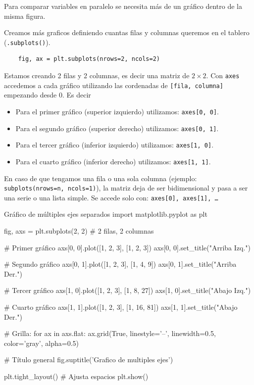 Para comparar variables en paralelo se necesita más de un gráfico dentro de la misma figura. 

Creamos más graficos definiendo cuantas filas y columnas queremos en el tablero (\texttt{.subplots()}).
\begin{verbatim}
    fig, ax = plt.subplots(nrows=2, ncols=2)
\end{verbatim}
Estamos creando 2 filas y 2 columnas, es decir una matriz de \(2 \times 2\).
Con \texttt{axes} accedemos a cada gráfico utilizando las cordenadas de \texttt{[fila, columna]} empezando desde 0. Es decir \begin{itemize}
    \item Para el primer gráfico (superior izquierdo) utilizamos: \texttt{axes[0, 0]}.
    \item Para el segundo gráfico (superior derecho) utilizamos: \texttt{axes[0, 1]}.
    \item Para el tercer gráfico (inferior izquierdo) utilizamos: \texttt{axes[1, 0]}.
    \item Para el cuarto gráfico (inferior derecho) utilizamos: \texttt{axes[1, 1]}.
\end{itemize}

En caso de que tengamos una fila o una sola columna (ejemplo: \texttt{subplots(nrows=n, ncols=1)}), la matriz deja de ser bidimensional y pasa a ser una serie o una lista simple. Se accede solo con: \texttt{axes[0], axes[1], \dots}

\begin{pycode}{Gráfico de múltiples ejes separados}
import matplotlib.pyplot as plt

fig, axs = plt.subplots(2, 2) # 2 filas, 2 columnas

# Primer gráfico
axs[0, 0].plot([1, 2, 3], [1, 2, 3])
axs[0, 0].set_title("Arriba Izq.")

# Segundo gráfico
axs[0, 1].plot([1, 2, 3], [1, 4, 9])
axs[0, 1].set_title("Arriba Der.")

# Tercer gráfico
axs[1, 0].plot([1, 2, 3], [1, 8, 27])
axs[1, 0].set_title("Abajo Izq.")

# Cuarto gráfico
axs[1, 1].plot([1, 2, 3], [1, 16, 81])
axs[1, 1].set_title("Abajo Der.")

# Grilla:
for ax in axs.flat:
    ax.grid(True, linestyle='--', linewidth=0.5, color='gray', alpha=0.5)

# Título general
fig.suptitle('Grafico de multiples ejes')

plt.tight_layout() # Ajusta espacios
plt.show()    
\end{pycode}

